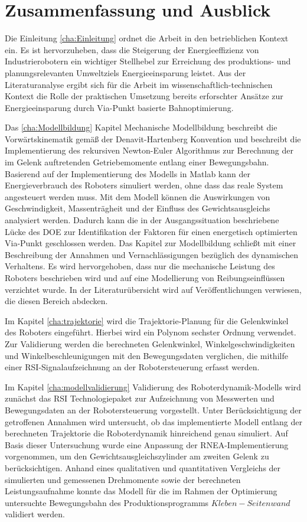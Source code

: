 \chapter{Zusammenfassung und Ausblick}
Die Einleitung \ref{cha:Einleitung} ordnet die Arbeit in den betrieblichen Kontext ein. Es ist hervorzuheben, dass die Steigerung der Energieeffizienz von Industrierobotern ein wichtiger Stellhebel zur Erreichung des produktions- und planungsrelevanten Umweltziels Energieeinsparung leistet. Aus der Literaturanalyse ergibt sich für die Arbeit im wissenschaftlich-technischen Kontext die Rolle der praktischen Umsetzung bereits erforschter Ansätze zur Energieeinsparung durch Via-Punkt basierte Bahnoptimierung.

Das \ref{cha:Modellbildung} Kapitel Mechanische Modellbildung  beschreibt die Vorwärtskinematik gemäß der Denavit-Hartenberg Konvention und beschreibt die Implementierung des rekursiven Newton-Euler Algorithmus zur Berechnung der im Gelenk auftretenden Getriebemomente entlang einer Bewegungsbahn. Basierend auf der Implementierung des Modells in Matlab kann der Energieverbrauch des Roboters simuliert werden, ohne dass das reale System angesteuert werden muss. Mit dem Modell können die Auswirkungen von Geschwindigkeit, Massenträgheit und der Einfluss des Gewichtsausgleichs analysiert werden. Dadurch kann die in der Ausgangssituation beschriebene Lücke des DOE zur Identifikation der Faktoren für einen energetisch optimierten Via-Punkt geschlossen werden. Das Kapitel zur Modellbildung schließt mit einer Beschreibung der Annahmen und Vernachlässigungen bezüglich des dynamischen Verhaltens. Es wird hervorgehoben, dass nur die mechanische Leistung des Roboters beschrieben wird und auf eine Modellierung von Reibungseinflüssen verzichtet wurde. In der Literaturübersicht wird auf Veröffentlichungen verwiesen, die diesen Bereich abdecken.

Im Kapitel \ref{cha:trajektorie} wird die Trajektorie-Planung für die Gelenkwinkel des Roboters eingeführt. Hierbei wird ein Polynom sechster Ordnung verwendet. Zur Validierung werden die berechneten Gelenkwinkel, Winkelgeschwindigkeiten und Winkelbeschleunigungen mit den Bewegungsdaten verglichen, die mithilfe einer RSI-Signalaufzeichnung an der Robotersteuerung erfasst werden.

Im Kapitel \ref{cha:modellvalidierung} Validierung des Roboterdynamik-Modells wird zunächst das RSI Technologiepaket zur Aufzeichnung von Messwerten und Bewegungsdaten an der Robotersteuerung vorgestellt. Unter Berücksichtigung der getroffenen Annahmen wird untersucht, ob das implementierte Modell entlang der berechneten Trajektorie die Roboterdynamik hinreichend genau simuliert. Auf Basis dieser Untersuchung wurde eine Anpassung der RNEA-Implementierung vorgenommen, um den Gewichtsausgleichszylinder am zweiten Gelenk zu berücksichtigen. Anhand eines qualitativen und quantitativen Vergleichs der simulierten und gemessenen Drehmomente sowie der berechneten Leistungsaufnahme konnte das Modell für die im Rahmen der Optimierung untersuchte Bewegungsbahn des Produktionsprogramms  $Kleben-Seitenwand$ validiert werden.


